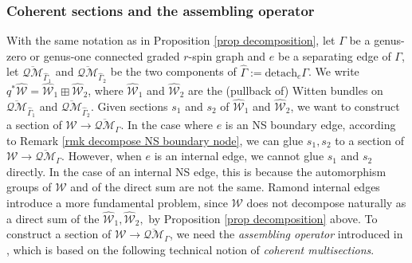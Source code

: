 \documentclass[11pt]{amsart}
\theoremstyle{definition}
\theoremstyle{remark}
\newcommand{\oQMb}{{\overline{\mathcal{QM}}}}
\newcommand{\<}{\left<}
\renewcommand{\>}{\right>}
\numberwithin{equation}{section}
\begin{document}
\subsubsection{Coherent sections and the assembling operator}\label{sec ass} 

   With the same notation as in Proposition \ref{prop decomposition}, let $\Gamma$ be a genus-zero or genus-one connected graded $r$-spin graph and $e$ be a separating edge of $\Gamma$, let $\oQMb_{\widehat{\Gamma}_1}$ and $\oQMb_{\widehat{\Gamma}_2}$ be the two components of $\widehat\Gamma:={\text{detach} }_e{\Gamma}$. We write $q^*\widehat{\mathcal{W}} = \widehat{\mathcal{W}}_1 \boxplus \widehat{\mathcal{W}}_2$, where $\widehat{\mathcal{W}}_1$ and $\widehat{\mathcal{W}}_2$ are the (pullback of) Witten bundles on $\oQMb_{\widehat{\Gamma}_1}$ and $\oQMb_{\widehat{\Gamma}_2}$. 
   Given sections $s_1$ and $s_2$ of $\widehat{\mathcal{W}}_1$ and $\widehat{\mathcal{W}}_2$, we want to construct a section of $\mathcal W \to \oQMb_\Gamma$. In the case where $e$ is an NS boundary edge, according to Remark \ref{rmk decompose NS boundary node}, we can glue $s_1,s_2$ 
 to a section of $\mathcal W \to \oQMb_\Gamma$. However, when $e$ is an internal edge, we cannot glue $s_1$ and $s_2$ directly. In the case of an internal NS edge, this is because the automorphism groups of ${\mathcal{W}}$ and of the direct sum are not the same. Ramond internal edges introduce a more fundamental problem, since ${\mathcal{W}}$ does not decompose naturally as a direct sum of the $\widehat{\mathcal{W}}_1,\widehat{\mathcal{W}}_2,$ by Proposition \ref{prop decomposition} above. To construct a section of $\mathcal W \to \overline{\mathcal{QM}}_\Gamma$, we need the \textit{assembling operator} introduced in \cite{BCT2}, which is based on the following technical notion of \textit{coherent multisections}. 
  
\end{document}
